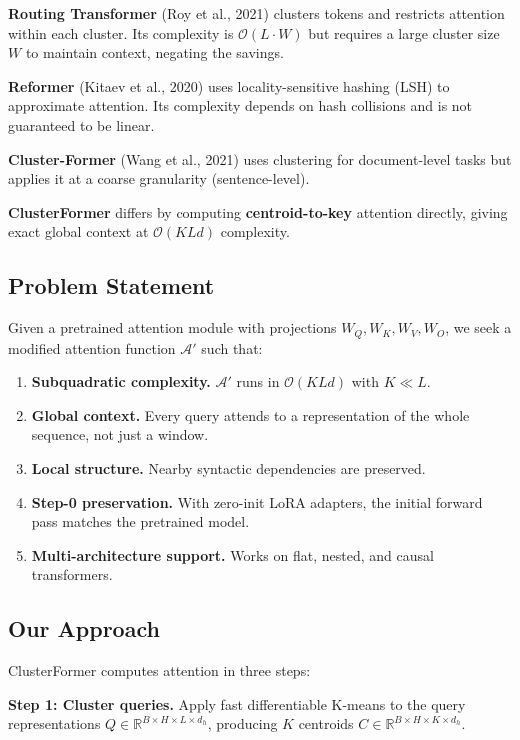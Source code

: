 \textbf{Routing Transformer} (Roy et al., 2021) clusters tokens and restricts 
attention within each cluster. Its complexity is $\mathcal{O}(L \cdot W)$ 
but requires a large cluster size $W$ to maintain context, negating the 
savings.

\textbf{Reformer} (Kitaev et al., 2020) uses locality-sensitive hashing (LSH) 
to approximate attention. Its complexity depends on hash collisions and is 
not guaranteed to be linear.

\textbf{Cluster-Former} (Wang et al., 2021) uses clustering for document-level 
tasks but applies it at a coarse granularity (sentence-level).

\textbf{ClusterFormer} differs by computing \textbf{centroid-to-key} attention 
directly, giving exact global context at $\mathcal{O}(K L d)$ complexity.

\subsection{Problem Statement}

Given a pretrained attention module with projections $W_Q, W_K, W_V, W_O$, 
we seek a modified attention function $\mathcal{A}'$ such that:

\begin{enumerate}
\item \textbf{Subquadratic complexity.} $\mathcal{A}'$ runs in $\mathcal{O}(K L d)$
  with $K \ll L$.
\item \textbf{Global context.} Every query attends to a representation of the whole
  sequence, not just a window.
\item \textbf{Local structure.} Nearby syntactic dependencies are preserved.
\item \textbf{Step-0 preservation.} With zero-init LoRA adapters, the initial forward
  pass matches the pretrained model.
\item \textbf{Multi-architecture support.} Works on flat, nested, and causal
  transformers.

\end{enumerate}
\subsection{Our Approach}

ClusterFormer computes attention in three steps:

\textbf{Step 1: Cluster queries.} Apply fast differentiable K-means to the query 
representations $Q \in \mathbb{R}^{B \times H \times L \times d_h}$, 
producing $K$ centroids $C \in \mathbb{R}^{B \times H \times K \times d_h}$.

